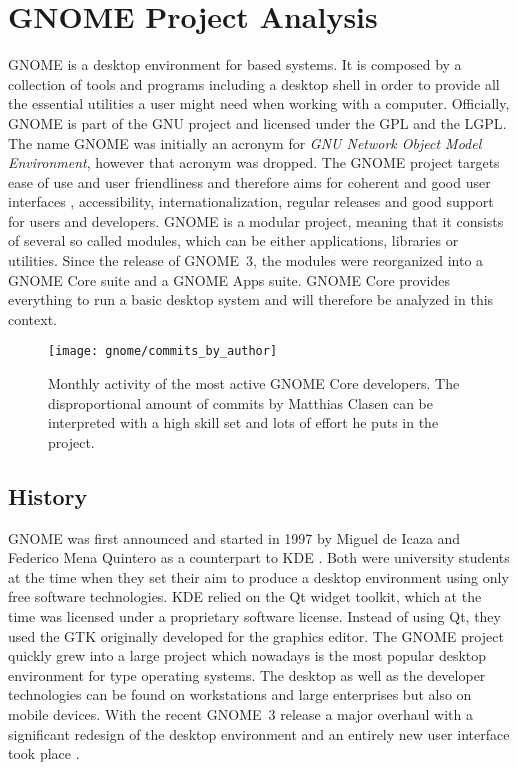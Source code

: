 \section{GNOME Project Analysis} %


GNOME is a desktop environment for  based systems. It
is composed by a collection of tools and programs including a desktop shell in
order to provide all the essential utilities a user might need when working
with a computer. Officially, GNOME is part of the \ac{GNU} project and licensed
under the \ac{GPL} and the \ac{LGPL}. The name GNOME was initially an acronym
for \emph{GNU Network Object Model Environment}, however that acronym was
dropped. The GNOME project targets ease of use and user friendliness and
therefore aims for coherent and good user interfaces \cite{GNOMEHIG},
accessibility, internationalization, regular releases and good support for
users and developers. GNOME is a modular project, meaning that it consists of
several so called modules, which can be either applications, libraries or
utilities. Since the release of GNOME~3, the modules were reorganized into a
GNOME Core suite and a GNOME Apps suite. GNOME Core provides everything to run
a basic desktop system and will therefore be analyzed in this context.

\begin{figure}[htbp]
  \centering
  \texttt{[image: gnome/commits\_by\_author]}
  \caption[Commits by Most Active Authors, GNOME]
  {Monthly activity of the most active GNOME Core developers. The
    disproportional amount of commits by Matthias Clasen can be interpreted
    with a high skill set and lots of effort he puts in the project.}
\end{figure}

\subsection{History} %

GNOME was first announced and started in 1997 by Miguel de Icaza and Federico
Mena Quintero as a counterpart to KDE
\cite{German2003,GNOMEAbout,GNOMEAnnouncement}. Both were university students
at the time when they set their aim to produce a desktop environment using only
free software technologies. KDE relied on the Qt widget toolkit, which at the
time was licensed under a proprietary software license. Instead of using Qt,
they used the \ac{GTK} originally developed for the  graphics
editor. The GNOME project quickly grew into a large project which nowadays is
the most popular desktop environment for  type operating
systems. The desktop as well as the developer technologies can be found on
workstations and large enterprises but also on mobile devices. With the recent
GNOME~3 release a major overhaul with a significant redesign of the desktop
environment and an entirely new user interface took place \cite{GNOMEPress}.

